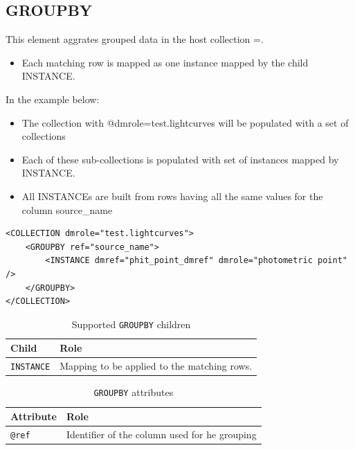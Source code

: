 \documentclass[11pt,a4paper]{ivoa}
\begin{document}
%
%
\subsection{GROUPBY}
This element aggrates grouped data in the host collection =.

\begin{itemize}
    \item Each matching row  is mapped as one instance mapped by the child INSTANCE.
\end{itemize}

In the example below:

\begin{itemize}
    \item The collection with @dmrole=test.lightcurves will be populated with a set of collections
    \item Each of these sub-collections is populated with set of instances mapped by  INSTANCE.
    \item All INSTANCEs are built from rows having all the same values for the column source\_name
\end{itemize}

\begin{lstlisting}[caption={GROUPBY examples},style=XML]
<COLLECTION dmrole="test.lightcurves">
    <GROUPBY ref="source_name">
        <INSTANCE dmref="phit_point_dmref" dmrole="photometric point" />
    </GROUPBY>
</COLLECTION>
\end{lstlisting}

\begin{table}[hbtp]
\small
\centering
\begin{tabulary}{\linewidth}{|L|J|}
\hline
    \textbf{Child} &
    \textbf{Role} \\
\hline
     \texttt{INSTANCE}    &
     Mapping to be applied to the matching rows.  \\       
\hline
\end{tabulary}
     \caption{Supported  \texttt{GROUPBY} children} 
     \label{tbl:group-children}
\end{table}

\begin{table}[!htbp]
\small
\centering
\begin{tabulary}{\linewidth}{|L|J|}
       \hline
           \textbf{Attribute} &  
           \textbf{Role} \\
       \hline  
           \texttt{@ref}    & 
           Identifier of the column used for he grouping \\       
        \hline 
\end{tabulary}
\caption{\texttt{GROUPBY} attributes} 
\label{tbl:group-att}
\end{table}
\end{document}
